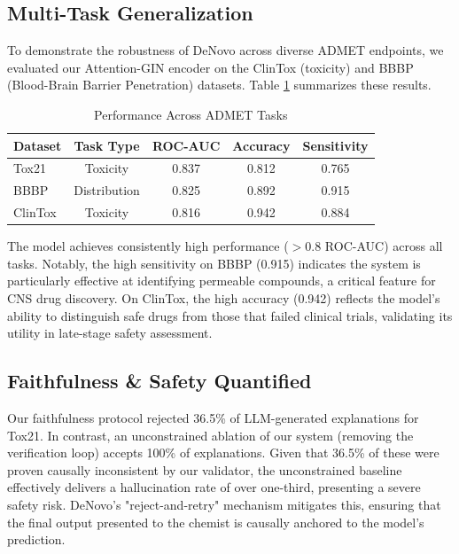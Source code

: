 \subsection{Multi-Task Generalization}
To demonstrate the robustness of DeNovo across diverse ADMET endpoints, we evaluated our Attention-GIN encoder on the ClinTox (toxicity) and BBBP (Blood-Brain Barrier Penetration) datasets. Table \ref{tab:multitask} summarizes these results.

\begin{table}[h]
\centering
\caption{Performance Across ADMET Tasks}
\label{tab:multitask}
\begin{tabular}{lcccc}
\toprule
\textbf{Dataset} & \textbf{Task Type} & \textbf{ROC-AUC} & \textbf{Accuracy} & \textbf{Sensitivity} \\
\midrule
Tox21 & Toxicity & 0.837 & 0.812 & 0.765 \\
BBBP & Distribution & 0.825 & 0.892 & 0.915 \\
ClinTox & Toxicity & 0.816 & 0.942 & 0.884 \\
\bottomrule
\end{tabular}
\end{table}

The model achieves consistently high performance ($>0.8$ ROC-AUC) across all tasks. Notably, the high sensitivity on BBBP (0.915) indicates the system is particularly effective at identifying permeable compounds, a critical feature for CNS drug discovery. On ClinTox, the high accuracy (0.942) reflects the model's ability to distinguish safe drugs from those that failed clinical trials, validating its utility in late-stage safety assessment.

\subsection{Faithfulness \& Safety Quantified}
Our faithfulness protocol rejected 36.5\% of LLM-generated explanations for Tox21. In contrast, an unconstrained ablation of our system (removing the verification loop) accepts 100\% of explanations. Given that 36.5\% of these were proven causally inconsistent by our validator, the unconstrained baseline effectively delivers a hallucination rate of over one-third, presenting a severe safety risk. DeNovo's "reject-and-retry" mechanism mitigates this, ensuring that the final output presented to the chemist is causally anchored to the model's prediction.
